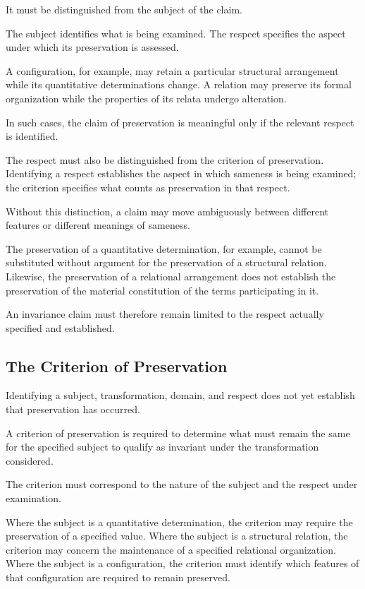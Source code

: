 It must be distinguished from the subject
of the claim.

The subject identifies what is being
examined. The respect specifies the
aspect under which its preservation
is assessed.

A configuration, for example, may retain
a particular structural arrangement while
its quantitative determinations change.
A relation may preserve its formal
organization while the properties of
its relata undergo alteration.

In such cases, the claim of preservation
is meaningful only if the relevant
respect is identified.

The respect must also be distinguished
from the criterion of preservation.
Identifying a respect establishes the
aspect in which sameness is being
examined; the criterion specifies
what counts as preservation in that
respect.

Without this distinction, a claim may
move ambiguously between different
features or different meanings of
sameness.

The preservation of a quantitative
determination, for example, cannot
be substituted without argument for
the preservation of a structural
relation. Likewise, the preservation
of a relational arrangement does
not establish the preservation of
the material constitution of the
terms participating in it.

An invariance claim must therefore
remain limited to the respect actually
specified and established.

\subsection{The Criterion of Preservation}

Identifying a subject, transformation,
domain, and respect does not yet establish
that preservation has occurred.

A criterion of preservation is required
to determine what must remain the same
for the specified subject to qualify
as invariant under the transformation
considered.

The criterion must correspond to the
nature of the subject and the respect
under examination.

Where the subject is a quantitative
determination, the criterion may require
the preservation of a specified value.
Where the subject is a structural relation,
the criterion may concern the maintenance
of a specified relational organization.
Where the subject is a configuration,
the criterion must identify which features
of that configuration are required to
remain preserved.

